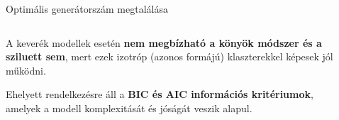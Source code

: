 \documentclass[english, aspectratio=169]{beamer}
\begin{document}
\begin{frame}{Optimális generátorszám megtalálása}
\begin{columns}
\begin{column}{.5\textwidth}
A keverék modellek esetén \textbf{nem megbízható a könyök módszer és a sziluett sem}, mert ezek izotróp (azonos formájú) klaszterekkel képesek jól működni.\par\medskip
Ehelyett rendelkezésre áll a \textbf{BIC és AIC információs kritériumok}, amelyek a modell komplexitását és jóságát veszik alapul.
\end{column}
\begin{column}{.5\textwidth}
\end{column}
\end{columns}
\end{frame}
\end{document}
